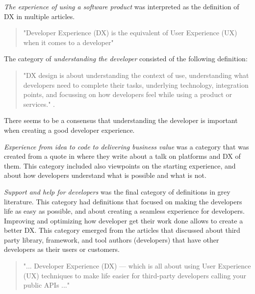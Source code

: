 \documentclass[english, 12pt, a4paper, sci, utf8, a-1b, online]{aaltothesis}
\newcounter{subsubsubsection}[subsubsection]
\begin{document}
\textit{The experience of using a software product} was interpreted as the definition of DX in multiple articles.

\begin{quote}
  "Developer Experience (DX) is the equivalent of User Experience (UX) when it comes to a developer" \parencite{the-best-practices-for-a-great-dx}
\end{quote}

\noindent The category of \textit{understanding the developer} consisted of the following definition:

\begin{quote}
  "DX design is about understanding the context of use, understanding what developers need to complete their tasks, underlying technology, integration points, and focussing on how developers feel while using a product or services." \parencite{building-the-developer-experience-from-the-ground-up}.
\end{quote}

\noindent There seems to be a consensus that understanding the developer is important when creating a good developer experience.

\textit{Experience from idea to code to delivering business value} was a category that was created from a quote in \textcite{workflows-for-the-new-developer-experience} where they write about a talk on platforms and DX of them. This category included also viewpoints on the starting experience, and about how developers understand what is possible and what is not.

\textit{Support and help for developers} was the final category of definitions in grey literature. This category had definitions that focused on making the developers life as easy as possible, and about creating a seamless experience for developers. Improving and optimizing how developer get their work done allows to create a better DX. This category emerged from the articles that discussed about third party library, framework, and tool authors (developers) that have other developers as their users or customers.

\begin{quote}
  "... Developer Experience (DX) — which is all about using User Experience (UX) techniques to make life easier for third-party developers calling your public APIs ..." \parencite{4-must-read-articles-on-developer-experience}
\end{quote}

\end{document}
